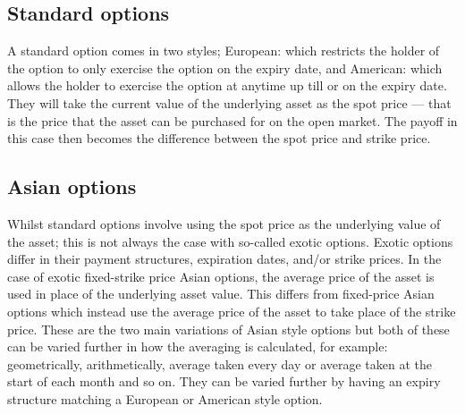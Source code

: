 

\subsection{Standard options}

A standard option comes in two styles; European: which restricts the holder of the option to only exercise the option on the expiry date, and American: which allows the holder to exercise the option at anytime up till or on the expiry date. They will take the current value of the underlying asset as the spot price --- that is the price that the asset can be purchased for on the open market. The payoff in this case then becomes the difference between the spot price and strike price.

\subsection{Asian options}

Whilst standard options involve using the spot price as the underlying value of the asset; this is not always the case with so-called exotic options. Exotic options differ in their payment structures, expiration dates, and/or strike prices. In the case of exotic fixed-strike price Asian options, the average price of the asset is used in place of the underlying asset value. This differs from fixed-price Asian options which instead use the average price of the asset to take place of the strike price. These are the two main variations of Asian style options but both of these can be varied further in how the averaging is calculated, for example: geometrically, arithmetically, average taken every day or average taken at the start of each month and so on. They can be varied further by having an expiry structure matching a European or American style option.

